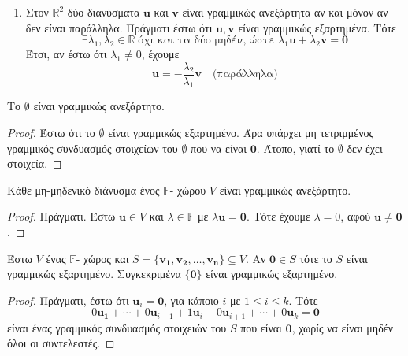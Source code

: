 \documentclass[a4paper,table]{report}
\begin{document}
\begin{examples}
\item {}
  \begin{enumerate}
    \item Στον $ \mathbb{R}^{2} $ δύο διανύσματα $ \mathbf{u} $ και $ \mathbf{v} $ 
      είναι γραμμικώς ανεξάρτητα αν και μόνον αν δεν είναι παράλληλα. Πράγματι 
      έστω ότι $ \mathbf{u}, \mathbf{v} $ είναι γραμμικώς εξαρτημένα. Τότε 
      \[
        \exists \lambda _{1}, \lambda _{2} \in \mathbb{R} \; 
        \text{όχι και τα δύο μηδέν, ώστε} 
        \; \lambda_{1} \mathbf{u} + \lambda_{2} \mathbf{v} = \mathbf{0} 
      \]
      Έτσι, αν έστω ότι $ \lambda_{1} \neq 0 $, έχουμε 
      \[
        \mathbf{u} = - \frac{\lambda _{2}}{\lambda _{1}} \mathbf{v} \quad  
        \text{(παράλληλα)}
      \] 
  \end{enumerate}
\end{examples}

\begin{prop}
  Το $ \emptyset $ είναι γραμμικώς ανεξάρτητο. 
\end{prop}
\begin{proof}
  Έστω ότι το $ \emptyset $ είναι γραμμικώς εξαρτημένο. Άρα υπάρχει μη τετριμμένος 
  γραμμικός συνδυασμός στοιχείων του $ \emptyset $ που να είναι 
  $ \mathbf{0} $. Άτοπο, γιατί το $ \emptyset $ δεν έχει στοιχεία.
\end{proof}

\begin{prop}
  Κάθε μη-μηδενικό διάνυσμα ένος $ \mathbb{F} $- χώρου $V$ είναι γραμμικώς 
  ανεξάρτητο.
\end{prop}
\begin{proof}
  Πράγματι. Έστω $ \mathbf{u} \in V $ και $ \lambda \in \mathbb{F} $ με 
  $ \lambda \mathbf{u} = \mathbf{0} $. Τότε έχουμε $ \lambda = 0 $, αφού 
  $ \mathbf{u} \neq \mathbf{0} $.
\end{proof}

\begin{prop}
  Έστω $V$ ένας $ \mathbb{F} $- χώρος και 
  $ S = \{ \mathbf{v_{1}}, \mathbf{v_{2}}, \ldots, \mathbf{v_{n}}  \} \subseteq V $.
  Αν $ \mathbf{0} \in S $ τότε το $S$ είναι γραμμικώς εξαρτημένο. Συγκεκριμένα 
  $ \{ \mathbf{0} \} $ είναι γραμμικώς εξαρτημένο.
\end{prop}
\begin{proof}
  Πράγματι, έστω ότι $ \mathbf{u}_{i} = \mathbf{0} $, για κάποιο $ i $ με 
  $ 1 \leq i \leq k $. Τότε
  \[
    0 \mathbf{u_{1}}+ \cdots + 0 \mathbf{u}_{i-1} + 1 \mathbf{u}_{i} + 0 
    \mathbf{u}_{i+1} + \cdots + 0 \mathbf{u}_{k} = \mathbf{0}  
  \]
  είναι ένας γραμμικός συνδυασμός στοιχειών του $S$ που είναι $ \mathbf{0} $, 
  χωρίς να είναι μηδέν όλοι οι συντελεστές.
\end{proof}
\end{document}
